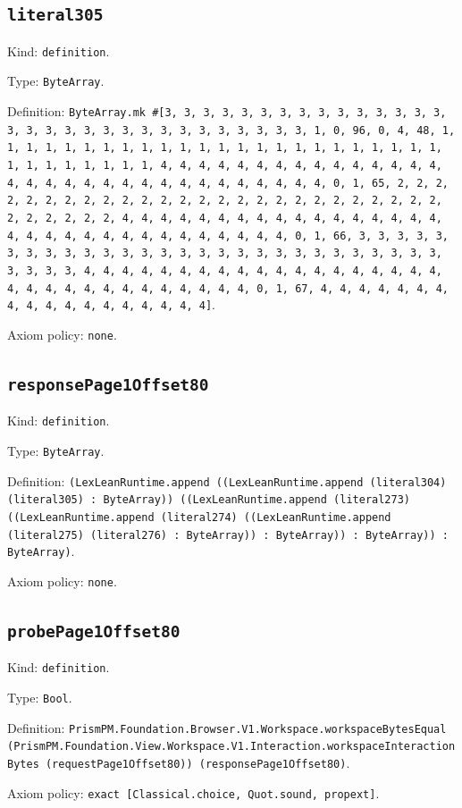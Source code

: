 \documentclass[11pt]{article}
\begin{document}
\subsection*{\texttt{literal305}}
\noindent Kind: \texttt{definition}.\par
\noindent Type: \texttt{ByteArray}.\par
\noindent Definition: \texttt{ByteArray.mk \#[3, 3, 3, 3, 3, 3, 3, 3, 3, 3, 3, 3, 3, 3, 3, 3, 3, 3, 3, 3, 3, 3, 3, 3, 3, 3, 3, 3, 3, 3, 3, 1, 0, 96, 0, 4, 48, 1, 1, 1, 1, 1, 1, 1, 1, 1, 1, 1, 1, 1, 1, 1, 1, 1, 1, 1, 1, 1, 1, 1, 1, 1, 1, 1, 1, 1, 1, 1, 1, 4, 4, 4, 4, 4, 4, 4, 4, 4, 4, 4, 4, 4, 4, 4, 4, 4, 4, 4, 4, 4, 4, 4, 4, 4, 4, 4, 4, 4, 4, 4, 4, 0, 1, 65, 2, 2, 2, 2, 2, 2, 2, 2, 2, 2, 2, 2, 2, 2, 2, 2, 2, 2, 2, 2, 2, 2, 2, 2, 2, 2, 2, 2, 2, 2, 2, 2, 4, 4, 4, 4, 4, 4, 4, 4, 4, 4, 4, 4, 4, 4, 4, 4, 4, 4, 4, 4, 4, 4, 4, 4, 4, 4, 4, 4, 4, 4, 4, 4, 0, 1, 66, 3, 3, 3, 3, 3, 3, 3, 3, 3, 3, 3, 3, 3, 3, 3, 3, 3, 3, 3, 3, 3, 3, 3, 3, 3, 3, 3, 3, 3, 3, 3, 3, 4, 4, 4, 4, 4, 4, 4, 4, 4, 4, 4, 4, 4, 4, 4, 4, 4, 4, 4, 4, 4, 4, 4, 4, 4, 4, 4, 4, 4, 4, 4, 4, 0, 1, 67, 4, 4, 4, 4, 4, 4, 4, 4, 4, 4, 4, 4, 4, 4, 4, 4, 4, 4]}.\par
\noindent Axiom policy: \texttt{none}.\par
\subsection*{\texttt{responsePage1Offset80}}
\noindent Kind: \texttt{definition}.\par
\noindent Type: \texttt{ByteArray}.\par
\noindent Definition: \texttt{(LexLeanRuntime.append ((LexLeanRuntime.append (literal304) (literal305) : ByteArray)) ((LexLeanRuntime.append (literal273) ((LexLeanRuntime.append (literal274) ((LexLeanRuntime.append (literal275) (literal276) : ByteArray)) : ByteArray)) : ByteArray)) : ByteArray)}.\par
\noindent Axiom policy: \texttt{none}.\par
\subsection*{\texttt{probePage1Offset80}}
\noindent Kind: \texttt{definition}.\par
\noindent Type: \texttt{Bool}.\par
\noindent Definition: \texttt{PrismPM.Foundation.Browser.V1.Workspace.workspaceBytesEqual (PrismPM.Foundation.View.Workspace.V1.Interaction.workspaceInteractionBytes (requestPage1Offset80)) (responsePage1Offset80)}.\par
\noindent Axiom policy: \texttt{exact [Classical.choice, Quot.sound, propext]}.\par
\end{document}
